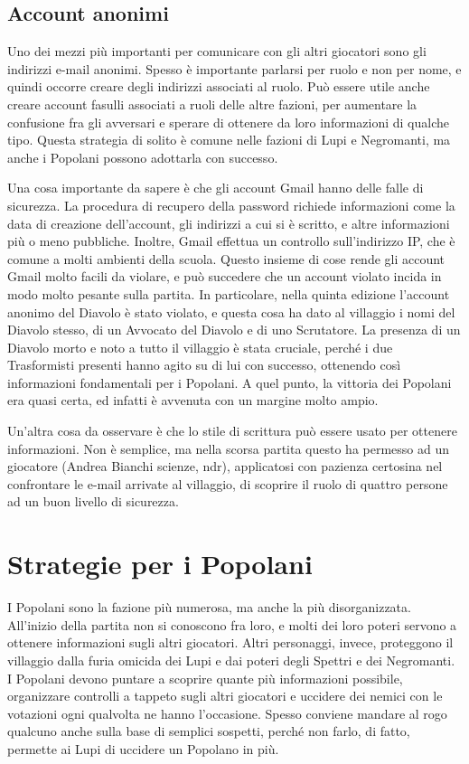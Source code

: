 \documentclass[a4paper,10pt]{article}
\begin{document}
\subsection{Account anonimi}

Uno dei mezzi più importanti per comunicare con gli altri giocatori sono gli indirizzi e-mail anonimi. Spesso è importante parlarsi per ruolo e non per nome, e quindi occorre creare degli indirizzi associati al ruolo. Può essere utile anche creare account fasulli associati a ruoli delle altre fazioni, per aumentare la confusione fra gli avversari e sperare di ottenere da loro informazioni di qualche tipo. Questa strategia di solito è comune nelle fazioni di Lupi e Negromanti, ma anche i Popolani possono adottarla con successo.

Una cosa importante da sapere è che gli account Gmail hanno delle falle di sicurezza. La procedura di recupero della password richiede informazioni come la data di creazione dell'account, gli indirizzi a cui si è scritto, e altre informazioni più o meno pubbliche. Inoltre, Gmail effettua un controllo sull'indirizzo IP, che è comune a molti ambienti della scuola. Questo insieme di cose rende gli account Gmail molto facili da violare, e può succedere che un account violato incida in modo molto pesante sulla partita.
In particolare, nella quinta edizione l'account anonimo del Diavolo è stato violato, e questa cosa ha dato al villaggio i nomi del Diavolo stesso, di un Avvocato del Diavolo e di uno Scrutatore. La presenza di un Diavolo morto e noto a tutto il villaggio è stata cruciale, perché i due Trasformisti presenti hanno agito su di lui con successo, ottenendo così informazioni fondamentali per i Popolani. A quel punto, la vittoria dei Popolani era quasi certa, ed infatti è avvenuta con un margine molto ampio.

Un'altra cosa da osservare è che lo stile di scrittura può essere usato per ottenere informazioni. Non è semplice, ma nella scorsa partita questo ha permesso ad un giocatore (Andrea Bianchi scienze, ndr), applicatosi con pazienza certosina nel confrontare le e-mail arrivate al villaggio, di scoprire il ruolo di quattro persone ad un buon livello di sicurezza.

\section{Strategie per i Popolani}

I Popolani sono la fazione più numerosa, ma anche la più disorganizzata. All'inizio della partita non si conoscono fra loro, e molti dei loro poteri servono a ottenere informazioni sugli altri giocatori. Altri personaggi, invece, proteggono il villaggio dalla furia omicida dei Lupi e dai poteri degli Spettri e dei Negromanti.
I Popolani devono puntare a scoprire quante più informazioni possibile, organizzare controlli a tappeto sugli altri giocatori e uccidere dei nemici con le votazioni ogni qualvolta ne hanno l'occasione. Spesso conviene mandare al rogo qualcuno anche sulla base di semplici sospetti, perché non farlo, di fatto, permette ai Lupi di uccidere un Popolano in più.
\end{document}
